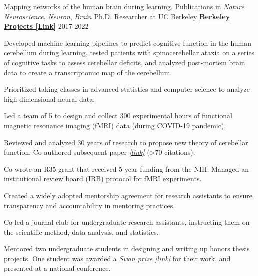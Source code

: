 \begin{cventries}
  \cventry
  	{Mapping networks of the human brain during learning. Publications in \textit{Nature Neuroscience}, \textit{Neuron}, \textit{Brain}}
    {Ph.D. Researcher at UC Berkeley} %
    {\href{https://github.com/maedbhk/cerebellum_learning_connect}{\textbf{Berkeley Projects [Link]}}}
    {2017-2022} %
    {
      \begin{cvitems} %
        \item {Developed machine learning pipelines to predict cognitive function in the human cerebellum during learning, tested patients with spinocerebellar ataxia on a series of cognitive tasks to assess cerebellar deficits, and analyzed post-mortem brain data to create a transcriptomic map of the cerebellum.}
        \item {Prioritized taking classes in advanced statistics and computer science to analyze high-dimensional neural data.} 
        \item {Led a team of 5 to design and collect 300 experimental hours of functional magnetic resonance imaging (fMRI) data (during COVID-19 pandemic).}
		\item {Reviewed and analyzed 30 years of research to propose new theory of cerebellar function. Co-authored subsequent paper \href{https://www.sciencedirect.com/science/article/pii/S0896627319303782}{\textit{[link]}} (>70 citations).}
        \item {Co-wrote an R35 grant that received 5-year funding from the NIH. Managed an institutional review board (IRB) protocol for fMRI experiments.}
        \item {Created a widely adopted mentorship agreement for research assistants to ensure transparency and accountability in mentoring practices.}
        \item {Co-led a journal club for undergraduate research assistants, instructing them on the scientific method, data analysis, and statistics.}
        \item {Mentored two undergraduate students in designing and writing up honors thesis projects. One student was awarded a \href{https://psychology.berkeley.edu/sites/default/files/undergraduate-program/swanaward_application_2019-2020.pdf}{\textit{Swan prize [link]}} for their work, and presented at a national conference.}
      \end{cvitems}
    }
    

\end{cventries}
